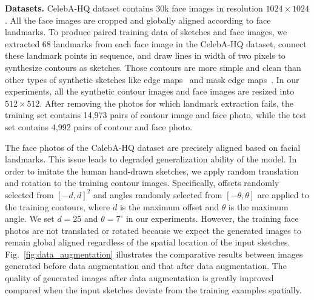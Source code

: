 \documentclass{article}
\begin{document}
\noindent
\textbf{Datasets.}
CelebA-HQ dataset contains 30k face images in resolution $1024\times1024$. All the face images are cropped and globally aligned according to face landmarks.
To produce paired training data of sketches and face images, we extracted 68 landmarks from each face image in the CelebA-HQ dataset, connect these landmark points in sequence, and draw lines in width of two pixels to synthesize contours as sketches.
Those contours are more simple and clean than other types of synthetic sketches like edge maps~\cite{csagan} and mask edge maps~\cite{maskgan}. 
In our experiments, all the synthetic contour images and face images are resized into $512\times512$. 
After removing the photos for which landmark extraction fails, the training set contains 14,973 pairs of contour image and face photo, while the test set contains 4,992 pairs of contour and face photo. 

The face photos of the CalebA-HQ dataset are precisely aligned based on facial landmarks. 
This issue leads to degraded generalization ability of the model.
%
In order to imitate the human hand-drawn sketches, we apply random translation and rotation to the training contour images. 
Specifically, offsets randomly selected from $[-d,d]^2$ and angles randomly selected from $[-\theta,\theta]$ are applied to the training contours, where $d$ is the maximum offset and $\theta$ is the maximum angle.
We set $d=25$ and $\theta=7^\circ$ in our experiments. 
However, the training face photos are not translated or rotated because we expect the generated images to remain global aligned regardless of the spatial location of the input sketches.
Fig.~\ref{fig:data_augmentation} illustrates the comparative results between images generated before data augmentation and that after data augmentation. 
The quality of generated images after data augmentation is greatly improved compared when the input sketches deviate from the training examples spatially.
\end{document}
